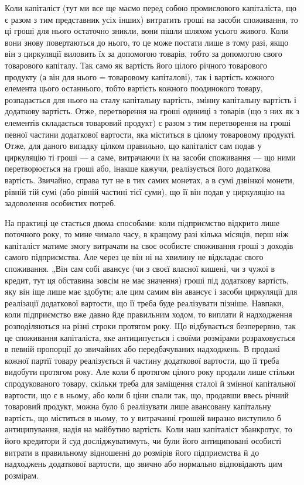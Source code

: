 Коли капіталіст (тут ми все ще маємо перед собою промислового капіталіста,
що є разом з тим представник усіх інших) витратить гроші на
засоби споживання, то ці гроші для нього остаточно зникли, вони пішли
шляхом усього живого. Коли вони знову повертаються до нього, то це
може постати лише в тому разі, якщо він з циркуляції виловить їх за допомогою
товарів, тобто за допомогою свого товарового капіталу. Так само
як вартість його цілого річного товарового продукту (а він для нього = товаровому
капіталові), так і вартість кожного елемента цього останнього, тобто
вартість кожного поодинокого товару, розпадається для нього на сталу капітальну
вартість, змінну капітальну вартість і додаткову вартість. Отже,
перетворення на гроші одиниці з товарів (що з них як з елементів складається
товаровий продукт) є разом з тим перетворення на гроші певної частини
додаткової вартости, яка міститься в цілому товаровому продукті. Отже,
для даного випадку цілком правильно, що капіталіст сам подав у циркуляцію
ті гроші — а саме, витрачаючи їх на засоби споживання — що
ними перетворюється на гроші або, інакше кажучи, реалізується його
додаткова вартість. Звичайно, справа тут не в тих самих монетах, а
в сумі дзвінкої монети, рівній тій сумі (або рівній частині тієї суми),
що її він подав у циркуляцію на задоволення особистих потреб.

На практиці це стається двома способами: коли підприємство відкрито
лише поточного року, то мине чимало часу, в кращому разі кілька місяців,
перш ніж капіталіст матиме змогу витрачати на своє особисте споживання
гроші з доходів самого підприємства. Але через це він ні на хвилину
не відкладає свого споживання. „Він сам собі авансує (чи з своєї
власної кишені, чи з чужої в кредит, тут ця обставина зовсім не має
значення) гроші під додаткову вартість, яку він іще лише має здобути;
але цим самим він авансує і засоби циркуляції для реалізації додаткової
вартости, що її треба буде реалізувати пізніше. Навпаки, коли підприємство
вже давно йде правильним ходом, то виплати й надходження розподіляються
на різні строки протягом року. Що відбувається безперервно,
так це споживання капіталіста, яке антиципується і своїми розмірами
розраховується в певній пропорції до звичайних або передбачуваних надходжень.
В продажі кожної партії товару реалізується й частину додаткової
вартости, що її треба видобути протягом року. Але коли б протягом
цілого року продали лише стільки спродукованого товару, скільки
треба для заміщення сталої й змінної капітальної вартости, що є в ньому,
або коли б ціни спали так, що, продавши ввесь річний товаровий продукт,
можна було б реалізувати лише авансовану капітальну вартість, що
міститься в ньому, то у витрачанні грошей виразно виступило б антиципування,
надія на майбутню вартість. Коли наш капіталіст збанкротує,
то його кредитори й суд досліджуватимуть, чи були його антициповані
особисті витрати в правильному відношенні до розмірів його підприємства
й до надходжень додаткової вартости, що звично або нормально відповідають
цим розмірам.

